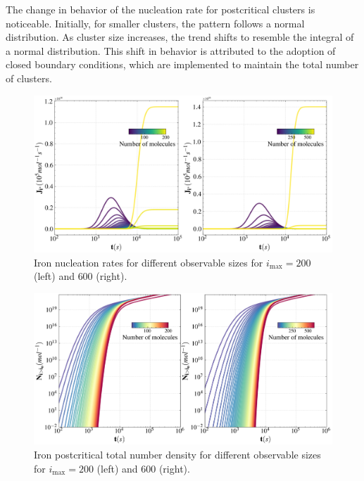 The change in behavior of the nucleation rate for postcritical clusters is noticeable. 
Initially, for smaller clusters, the pattern follows a normal distribution. As cluster 
size increases, the trend shifts to resemble the integral of a normal distribution. This shift 
in behavior is attributed to the adoption of closed boundary conditions, which are implemented to maintain the total number of clusters.
\begin{figure}[H]
    \centering
    \includegraphics[width=1.1\linewidth]{postcritical_nucleation_rate_cr_particles_comparison.png}
    \caption{Iron nucleation rates for different observable sizes for $i_{\text{max}} = 200$ (left) and $600$ (right).}
    \label{fig:postcritical_nucleation_rate_fe_particles_comparison}
\end{figure}

\begin{figure}[H]
    \centering
    \includegraphics[width=1.1\linewidth]{postcritical_number_density_cr_particles_comparison.png}
    \caption{Iron postcritical total number density for different observable sizes for $i_{\text{max}} = 200$ (left) and $600$ (right).}
    \label{fig:postcritical_number_density_fe_particles_comparison}
\end{figure}

